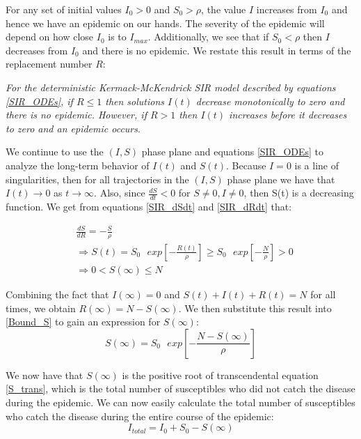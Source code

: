 \documentclass[reqno,11pt]{amsart}
\begin{document}
For any set of initial values $I_0 > 0$ and $S_0 > \rho$, the value $I$ increases from $I_0$ and hence we have an epidemic on our hands. The severity of the epidemic will depend on how close $I_0$ is to $I_{max}$. Additionally, we see that if $S_0 < \rho$ then $I$ decreases from $I_0$ and there is no epidemic. We restate this result in terms of the replacement number $ R$: 

\textit{For the deterministic Kermack-McKendrick SIR model described by equations \eqref{SIR_ODEs}, if $R \le 1$ then solutions $I(t)$ decrease monotonically to zero and there is no epidemic. However, if $R > 1 $  then $I(t)$ increases before it decreases to zero and an epidemic occurs}.

We continue to use the $(I,S)$ phase plane and equations \eqref{SIR_ODEs} to analyze the long-term behavior of $I(t)$ and $S(t)$. Because $I = 0 $ is a line of singularities, then for all trajectories in the $(I,S)$ phase plane we have that $I(t) \rightarrow 0$ as $t \rightarrow \infty$. Also, since $\frac{dS}{dt} < 0$ for $S \ne 0, I \ne 0$, then S(t) is a decreasing function. We get from equations \eqref{SIR_dSdt} and \eqref{SIR_dRdt} that:

\begin{equation}
\begin{split}
& \frac{dS}{dR} = - \frac{S}{\rho} \\
& \Rightarrow 	S(t) = S_0 \text{ } exp \left [- \frac{R(t)}{\rho} \right ] \ge S_0 \text{ } exp \left [- \frac{N}{\rho} \right ] > 0 \\
\label{Bound_S}
& \Rightarrow	0 < S(\infty) \le N
\end{split}
\end{equation}


Combining the fact that $I(\infty) = 0$ and $S(t) + I(t) + R(t) = N$ for all times, we obtain $R(\infty) = N - S(\infty)$. We then substitute this result into \eqref{Bound_S} to gain an expression for $S(\infty)$:
\begin{equation}\label{S_trans}
S(\infty) = S_0 \text{ } exp \left [ - \frac{N - S(\infty)}{\rho} \right ]
\end{equation}

We now have that $S(\infty)$ is the positive root of transcendental equation \eqref{S_trans}, which is the total number of susceptibles who did not catch the disease during the epidemic. We can now easily calculate the total number of susceptibles who catch the disease during the entire course of the epidemic:
\begin{equation*}
I_{total} = I_0 + S_0 - S(\infty)
\end{equation*}
\end{document}
